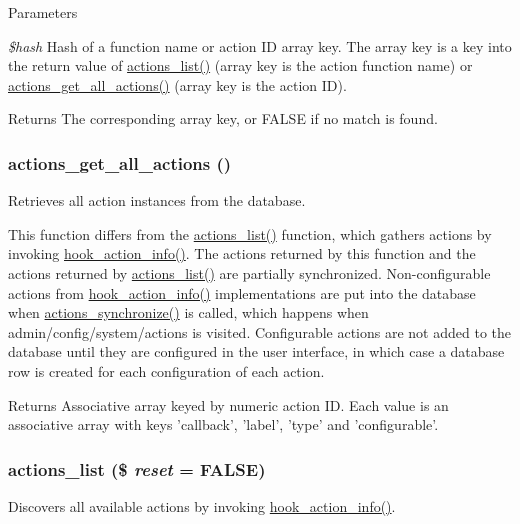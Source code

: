 \begin{DoxyParams}{Parameters}
\item[{\em \$hash}]Hash of a function name or action ID array key. The array key is a key into the return value of \hyperlink{actions_8inc_ad0dbf276d4ca1834760cffc7e1b1be53}{actions\_\-list()} (array key is the action function name) or \hyperlink{actions_8inc_a4275e9fee609ba6e85b03278a681436c}{actions\_\-get\_\-all\_\-actions()} (array key is the action ID).\end{DoxyParams}
\begin{DoxyReturn}{Returns}
The corresponding array key, or FALSE if no match is found. 
\end{DoxyReturn}
\hypertarget{actions_8inc_a4275e9fee609ba6e85b03278a681436c}{
\subsubsection[{actions\_\-get\_\-all\_\-actions}]{\setlength{\rightskip}{0pt plus 5cm}actions\_\-get\_\-all\_\-actions ()}}
\label{actions_8inc_a4275e9fee609ba6e85b03278a681436c}
Retrieves all action instances from the database.

This function differs from the \hyperlink{actions_8inc_ad0dbf276d4ca1834760cffc7e1b1be53}{actions\_\-list()} function, which gathers actions by invoking \hyperlink{group__actions_ga3df26c5d6496c91fcd0edd8648023fb4}{hook\_\-action\_\-info()}. The actions returned by this function and the actions returned by \hyperlink{actions_8inc_ad0dbf276d4ca1834760cffc7e1b1be53}{actions\_\-list()} are partially synchronized. Non-\/configurable actions from \hyperlink{group__actions_ga3df26c5d6496c91fcd0edd8648023fb4}{hook\_\-action\_\-info()} implementations are put into the database when \hyperlink{actions_8inc_a139190d8981f8e48be78b24d2adaab1c}{actions\_\-synchronize()} is called, which happens when admin/config/system/actions is visited. Configurable actions are not added to the database until they are configured in the user interface, in which case a database row is created for each configuration of each action.

\begin{DoxyReturn}{Returns}
Associative array keyed by numeric action ID. Each value is an associative array with keys 'callback', 'label', 'type' and 'configurable'. 
\end{DoxyReturn}
\hypertarget{actions_8inc_ad0dbf276d4ca1834760cffc7e1b1be53}{
\subsubsection[{actions\_\-list}]{\setlength{\rightskip}{0pt plus 5cm}actions\_\-list (\$ {\em reset} = {\ttfamily FALSE})}}
\label{actions_8inc_ad0dbf276d4ca1834760cffc7e1b1be53}
Discovers all available actions by invoking \hyperlink{group__actions_ga3df26c5d6496c91fcd0edd8648023fb4}{hook\_\-action\_\-info()}.

